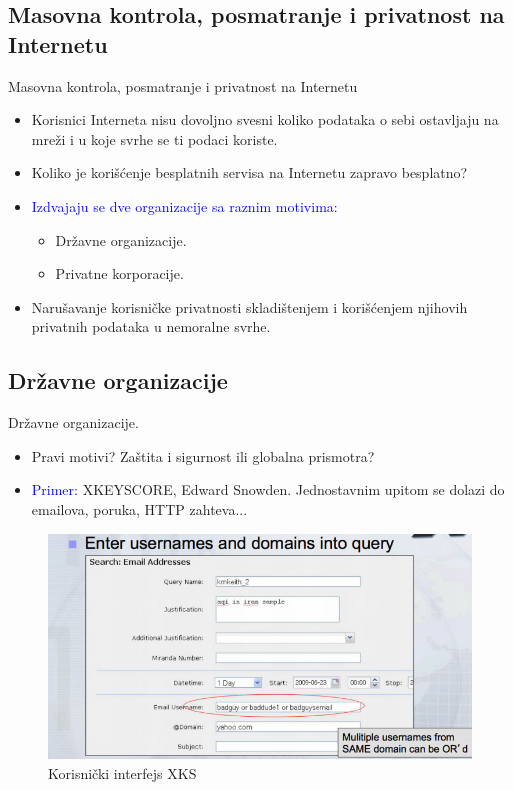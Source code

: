 \documentclass{beamer}
\begin{document}
		\subsection*{Masovna kontrola, posmatranje i privatnost na Internetu}
			\begin{frame}{Masovna kontrola, posmatranje i privatnost na Internetu}
			\begin{itemize}
				\item Korisnici Interneta nisu dovoljno svesni koliko podataka o sebi ostavljaju na mreži i u koje svrhe se ti podaci koriste.
				\item Koliko je korišćenje besplatnih servisa na Internetu zapravo besplatno?
				\item \textcolor{blue}{Izdvajaju se dve organizacije sa raznim motivima: }
					\begin{itemize}
						\item Državne organizacije.
						\item Privatne korporacije.
					\end{itemize}
				\item Narušavanje korisničke privatnosti skladištenjem i korišćenjem njihovih privatnih podataka u nemoralne svrhe.
			 \end{itemize}
			\end{frame}

			\subsection*{Državne organizacije}
			\begin{frame}{Državne organizacije.}
			\begin{itemize}
				\item Pravi motivi? Zaštita i sigurnost ili globalna prismotra?
				\item \textcolor{blue}{Primer:} XKEYSCORE, Edward Snowden. Jednostavnim upitom se dolazi do emailova, poruka, HTTP zahteva...
			 \end{itemize}
			 \begin{figure}[h!]
				\begin{center}
					\includegraphics[scale=1.3]{xks.jpg}
				\end{center}
				\caption{Korisnički interfejs XKS} 
			\end{figure}
			\end{frame}
			
\end{document}
